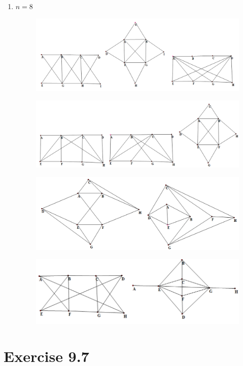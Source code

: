 \documentclass[a4paper,12pt,titlepage]{article}
\begin{document}
\begin{enumerate}
\begin{figure}[H]
\end{figure}
\item $n=8$
\begin{figure}[H]
    \centering
    \includegraphics[width=12cm]{81.png}
\end{figure}
\begin{figure}[H]
    \centering
    \includegraphics[width=12cm]{82.png}
\end{figure}
\begin{figure}[H]
    \centering
    \includegraphics[width=12cm]{83.png}
\end{figure}
\begin{figure}[H]
    \centering
    \includegraphics[width=12cm]{841.png}
\end{figure}
\end{enumerate}
\section*{Exercise 9.7}
\end{document}

